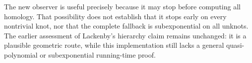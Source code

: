 The new observer is useful precisely because it may stop before computing
all homology.  That possibility does not establish that it stops early
on every nontrivial knot, nor that the complete fallback is subexponential
on all unknots.  The earlier assessment of Lackenby's hierarchy claim
remains unchanged: it is a plausible geometric route, while this
implementation still lacks a general quasi-polynomial or subexponential
running-time proof.
